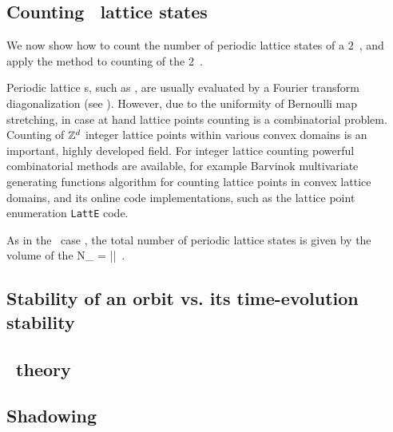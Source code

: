 \subsection{Counting \catlatt\ lattice states}
\label{s:catLattCount}

We now show how to count the number of periodic lattice states of a $2$\dmn\
\catlatt, and apply the method
to counting {\twots} of the 2\dmn\ \catlatt.

Periodic lattice {\HillDet}s, such as , are usually
evaluated by a Fourier transform diagonalization (see
). However, due to the uniformity of Bernoulli map
stretching, in case at hand lattice points counting is a combinatorial
problem. Counting of $\mathbb{Z}^d$ integer lattice points within various
convex domains is an important, highly developed field. For integer
lattice counting powerful combinatorial methods are available, for
example Barvinok multivariate generating functions algorithm for counting
lattice points in convex lattice domains\rf{Barvinok94}, and its online
code implementations, such as the lattice point enumeration
\texttt{LattE} code.

As in the \templatt\ case , the total number of periodic
lattice states is given by the volume of the {\fundPip}
\beq
N_\cl{} = |\Det\jMorb|
\,.

\subsection{Stability of an orbit vs. its time-evolution stability}
\label{s:catLattHill}

\subsection{\Po\ theory}
\label{s:catLattPoThe}



\subsection{Shadowing}
\label{s:catLattShadow}

